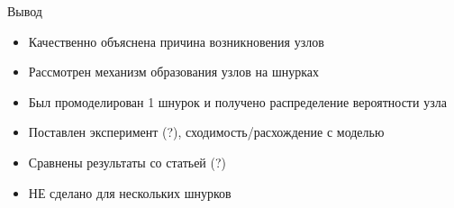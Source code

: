%
%
%
%

%
%

\begin{frame}{Вывод}
	\begin{itemize}
		\item Качественно объяснена причина возникновения узлов
		\item Рассмотрен механизм образования узлов на шнурках
		\item Был промоделирован 1 шнурок и получено распределение вероятности узла
		\item Поставлен эксперимент (?), сходимость/расхождение с моделью
		\item Сравнены результаты со статьей (?)
		\item НЕ сделано для нескольких шнурков
	\end{itemize}
\end{frame}

